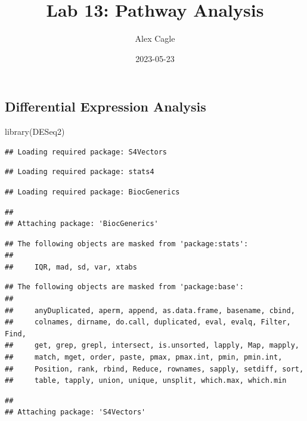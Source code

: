 \documentclass[
]{article}
\title{Lab 13: Pathway Analysis}
\author{Alex Cagle}
\date{2023-05-23}
\newenvironment{Shaded}{\begin{snugshade}}{\end{snugshade}}
\newcommand{\FunctionTok}[1]{\textcolor[rgb]{0.00,0.00,0.00}{#1}}
\newcommand{\NormalTok}[1]{#1}
\begin{document}
\maketitle

\hypertarget{differential-expression-analysis}{%
\subsection{Differential Expression
Analysis}\label{differential-expression-analysis}}

\begin{Shaded}
\begin{Highlighting}[]
\FunctionTok{library}\NormalTok{(DESeq2)}
\end{Highlighting}
\end{Shaded}

\begin{verbatim}
## Loading required package: S4Vectors
\end{verbatim}

\begin{verbatim}
## Loading required package: stats4
\end{verbatim}

\begin{verbatim}
## Loading required package: BiocGenerics
\end{verbatim}

\begin{verbatim}
## 
## Attaching package: 'BiocGenerics'
\end{verbatim}

\begin{verbatim}
## The following objects are masked from 'package:stats':
## 
##     IQR, mad, sd, var, xtabs
\end{verbatim}

\begin{verbatim}
## The following objects are masked from 'package:base':
## 
##     anyDuplicated, aperm, append, as.data.frame, basename, cbind,
##     colnames, dirname, do.call, duplicated, eval, evalq, Filter, Find,
##     get, grep, grepl, intersect, is.unsorted, lapply, Map, mapply,
##     match, mget, order, paste, pmax, pmax.int, pmin, pmin.int,
##     Position, rank, rbind, Reduce, rownames, sapply, setdiff, sort,
##     table, tapply, union, unique, unsplit, which.max, which.min
\end{verbatim}

\begin{verbatim}
## 
## Attaching package: 'S4Vectors'
\end{verbatim}
\end{document}
